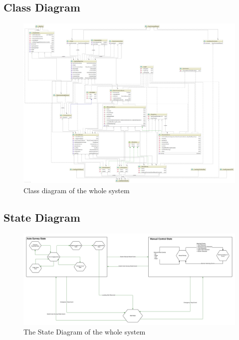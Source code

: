 \subsection{Class Diagram}
\begin{figure}[H]
	\centering
	\hspace*{-25mm}
	\includegraphics[width=1.4\textwidth]{ClassDiagram.png}	
	\caption{\label{fig:diagramClasses}Class diagram of the whole system}
\end{figure}	

\subsection{State Diagram}
\begin{figure}[H]
	\centering
	\hspace*{-15mm}
	\includegraphics[width=1.2\textwidth]{StateDiagram.png}	
	\caption{\label{fig:diagramState}The State Diagram of the whole system}
\end{figure}	


